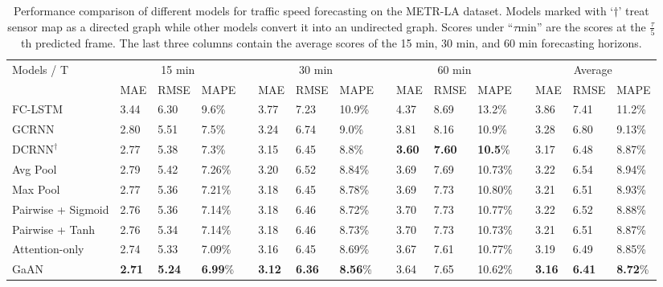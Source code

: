 \documentclass{article}
\begin{document}
	
	\begin{table*}[tb!]
		\centering
		\caption{Performance comparison of different models for traffic speed forecasting on the METR-LA dataset. Models marked with `$\dagger$' treat sensor map as a directed graph while other models convert it into an undirected graph. Scores under ``$\tau$min'' are the scores at the $\frac{\tau}{5}$th predicted frame. The last three columns contain the average scores of the 15 min, 30 min, and 60 min forecasting horizons.} \vskip -0.1in
		\begin{tabular}{l m{0.55cm}m{0.55cm}m{0.65cm} p{0.01cm} m{0.55cm}m{0.55cm}m{0.65cm} p{0.01cm} m{0.55cm}m{0.55cm}m{0.65cm} p{0.01cm} m{0.55cm}m{0.55cm}m{0.65cm}}
			\hline 
			\multirow{2}{*}{Models / T}   & \multicolumn{3}{c}{15 min} && \multicolumn{3}{c}{30 min}  && \multicolumn{3}{c}{60 min} && \multicolumn{3}{c}{Average}\\
			\cline{2-4}  \cline{6-8} \cline{10-12}  \cline{14-16}  
			& {\small MAE} & {\small RMSE} & {\small MAPE} && {\small MAE} & {\small RMSE} & {\small MAPE} && {\small MAE} & {\small RMSE} & {\small MAPE} && {\small MAE} & {\small RMSE} & {\small MAPE}\\
			\hline \hline
			FC-LSTM~{\tiny \citep{li2017graph}} & 3.44 & 6.30 & 9.6\% && 3.77 & 7.23 & 10.9\%&& 4.37 & 8.69 & 13.2\% && 3.86& 7.41& 11.2\%\\
			GCRNN~{\tiny \citep{li2017graph}}  & 2.80 & 5.51 & 7.5\% && 3.24 & 6.74 & 9.0\% && 3.81 & 8.16 & 10.9\% && 3.28 & 6.80 & 9.13\% \\
			$\text{DCRNN}^\dagger$~{\tiny \citep{li2017graph}}  & 2.77 & 5.38 & 7.3\% && 3.15 & 6.45 & 8.8\% && \textbf{3.60} & \textbf{7.60} & \textbf{10.5}\% && 3.17 & 6.48& 8.87\%\\ \hline
			Avg Pool & 2.79 & 5.42 & 7.26\% && 3.20 & 6.52 & 8.84\% && 3.69 & 7.69 & 10.73\% && 3.22 & 6.54 & 8.94\% \\
			Max Pool & 2.77 & 5.36 & 7.21\% && 3.18 & 6.45 & 8.78\% && 3.69 & 7.73 & 10.80\% && 3.21 & 6.51 & 8.93\%\\
			Pairwise + Sigmoid & 2.76 & 5.36 & 7.14\% && 3.18 & 6.46 & 8.72\% && 3.70 & 7.73 & 10.77\% && 3.22 & 6.52 & 8.88\%\\
			Pairwise + Tanh & 2.76 & 5.34 & 7.14\% && 3.18 & 6.46 & 8.73\% && 3.70 & 7.73 & 10.73\% && 3.21 & 6.51 & 8.87\%\\
			Attention-only      & 2.74 & 5.33 & 7.09\% && 3.16 & 6.45 & 8.69\% && 3.67 & 7.61 & 10.77\% && 3.19 & 6.49 & 8.85\% \\
			GaAN      & \textbf{2.71} & \textbf{5.24} & \textbf{6.99}\% && \textbf{3.12} & \textbf{6.36} & \textbf{8.56}\% && 3.64 & 7.65 & 10.62\% && \textbf{3.16} & \textbf{6.41} & \textbf{8.72}\% \\
			\hline
		\end{tabular}
		\label{table:result_traffic_speed}
	\end{table*}
	
\end{document}
